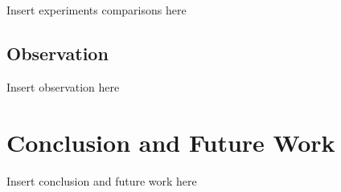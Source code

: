 \documentclass[conference]{IEEEtran}
\begin{document}
Insert experiments comparisons here


\subsection{Observation}

Insert observation here



\section{Conclusion and Future Work}

Insert conclusion and future work here

\end{document}
